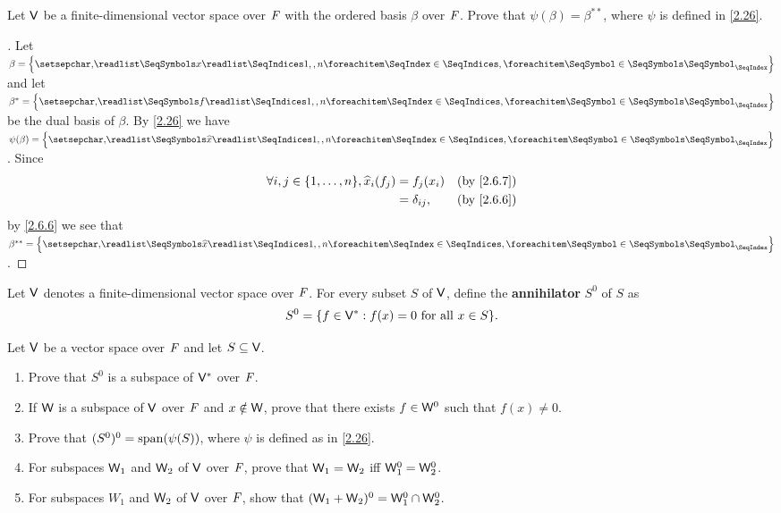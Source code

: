 \begin{ex}\label{ex:2.6.12}
	Let \(\mathsf{V}\) be a finite-dimensional vector space over \(\mathit{F}\) with the ordered basis \(\beta\) over \(\mathit{F}\).
	Prove that \(\psi(\beta) = \beta^{**}\), where \(\psi\) is defined in \cref{2.26}.
\end{ex}

\begin{proof}[]
	Let \(\beta = \set{\seq{x}{1,,n}}\) and let \(\beta^* = \set{\seq{f}{1,,n}}\) be the dual basis of \(\beta\).
	By \cref{2.26} we have \(\psi(\beta) = \set{\seq{\widehat{x}}{1,,n}}\).
	Since
	\begin{align*}
		\forall i, j \in \set{1, \dots, n}, \widehat{x}_i(f_j) & = f_j(x_i)      &  & \by{2.6.7} \\
		                                                       & = \delta_{i j}, &  & \by{2.6.6}
	\end{align*}
	by \cref{2.6.6} we see that \(\beta^{**} = \set{\seq{\widehat{x}}{1,,n}}\).
\end{proof}

\begin{defn}\label{2.6.10}
	Let \(\mathsf{V}\) denotes a finite-dimensional vector space over \(\mathit{F}\).
	For every subset \(S\) of \(\mathsf{V}\), define the \textbf{annihilator} \(S^0\) of \(S\) as
	\[
		S^0 = \set{f \in \V^* : f(x) = 0 \text{ for all } x \in S}.
	\]
\end{defn}

\begin{ex}\label{ex:2.6.13}
	Let \(\mathsf{V}\) be a vector space over \(\mathit{F}\) and let \(S \subseteq \mathsf{V}\).
	\begin{enumerate}
		\item Prove that \(S^0\) is a subspace of \(\mathsf{V}^*\) over \(\mathit{F}\).
		\item If \(\mathsf{W}\) is a subspace of \(\mathsf{V}\) over \(\mathit{F}\) and \(x \notin \mathsf{W}\), prove that there exists \(f \in \mathsf{W}^0\) such that \(f(x) \neq 0\).
		\item Prove that \((S^0)^0 = \spn{\psi(S)}\), where \(\psi\) is defined as in \cref{2.26}.
		\item For subspaces \(\mathsf{W}_1\) and \(\mathsf{W}_2\) of \(\mathsf{V}\) over \(\mathit{F}\), prove that \(\mathsf{W}_1 = \mathsf{W}_2\) iff \(\mathsf{W}_1^0 = \mathsf{W}_2^0\).
		\item For subspaces \(W_1\) and \(\mathsf{W}_2\) of \(\mathsf{V}\) over \(\mathit{F}\), show that \((\mathsf{W}_1 + \mathsf{W}_2)^0 = \mathsf{W}_1^0 \cap \mathsf{W}_2^0\).
	\end{enumerate}
\end{ex}

